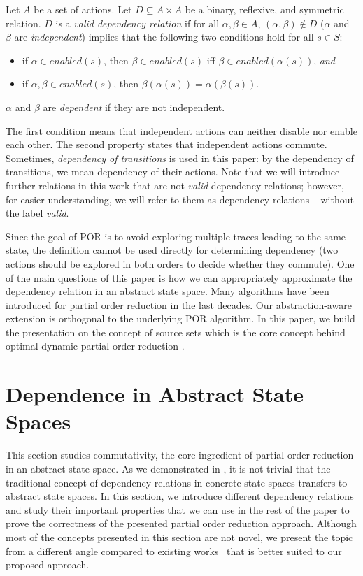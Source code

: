 \documentclass[numbook]{svjour3}
\begin{document}
\begin{definition}
	Let $A$ be a set of actions. Let $D \subseteq A \times A$ be a binary, reflexive, and symmetric relation. $D$ is a \emph{valid dependency relation} if for all $\alpha, \beta \in A$, $(\alpha, \beta) \notin D$ ($\alpha$ and $\beta$ are \emph{independent}) implies that the following two conditions hold for all $s \in S$:
	\begin{itemize}
		\item if $\alpha \in {enabled}(s)$, then $\beta \in {enabled}(s)$ iff $\beta \in {enabled}(\alpha(s))$, \emph{and}
		\item if $\alpha, \beta \in {enabled}(s)$, then $\beta(\alpha(s)) = \alpha(\beta(s))$.
	\end{itemize}
	
	$\alpha$ and $\beta$ are \emph{dependent} if they are not independent.
\end{definition}

The first condition means that independent actions can neither disable nor enable each other. The second property states that independent actions commute. Sometimes, \emph{dependency of transitions} is used in this paper: by the dependency of transitions, we mean dependency of their actions. Note that we will introduce further relations in this work that are not \emph{valid} dependency relations; however, for easier understanding, we will refer to them as dependency relations -- without the label \emph{valid}.

Since the goal of POR is to avoid exploring multiple traces leading to the same state, the definition cannot be used directly for determining dependency (two actions should be explored in both orders to decide whether they commute). One of the main questions of this paper is how we can appropriately approximate the dependency relation in an abstract state space. Many algorithms have been introduced for partial order reduction in the last decades. Our abstraction-aware extension is orthogonal to the underlying POR algorithm. In this paper, we build the presentation on the concept of source sets which is the core concept behind optimal dynamic partial order reduction \cite{optimal_dpor}.

\section{Dependence in Abstract State Spaces}
\label{sec:abstract-dependence}

This section studies commutativity, the core ingredient of partial order reduction in an abstract state space. As we demonstrated in , it is not trivial that the traditional concept of dependency relations in concrete state spaces transfers to abstract state spaces. In this section, we introduce different dependency relations and study their important properties that we can use in the rest of the paper to prove the correctness of the presented partial order reduction approach. Although most of the concepts presented in this section are not novel, we present the topic from a different angle compared to existing works~\cite{farzan_stratified_commutativity,sousa_abstract_unfoldings} that is better suited to our proposed approach.
\end{document}
